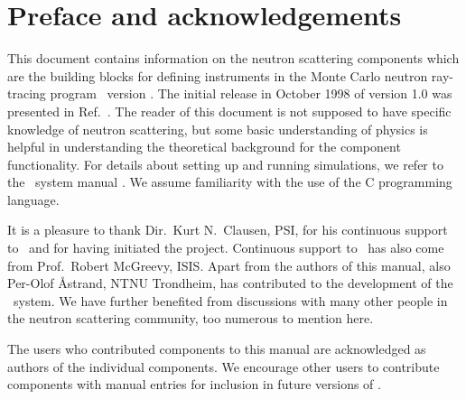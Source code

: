 
\chapter*{Preface and acknowledgements}
This document contains information on the neutron scattering components
which are the building blocks for defining instruments
in the Monte Carlo neutron
ray-tracing program \MCS\ version \version . The initial
release in October 1998 of version 1.0 was presented in Ref.~\cite{nn_10_20}.
The reader of this
document is not supposed to have specific knowledge of neutron scattering,
but some basic understanding of physics is helpful in
understanding the theoretical background for the component functionality.
For details about setting up and running simulations, we refer to
the \MCS\ system manual \cite{mcstasmanual}.
We assume familiarity with the use of
the C programming language.


It is a pleasure to thank Dir.~Kurt N.~Clausen, PSI, for his continuous
support to \MCS\ and for having initiated the project.
Continuous support to \MCS\ has also come from Prof.~Robert McGreevy, ISIS.
Apart from the authors of this manual, also Per-Olof \AA strand, NTNU Trondheim,
has contributed to the development of the \MCS\ system.
We have further benefited
from discussions with many other people in the neutron scattering
community, too numerous to mention here.

The users who contributed components to this manual are acknowledged
as authors of the individual components. We encourage other
users to contribute components with manual entries for inclusion in
future versions of \MCS.


